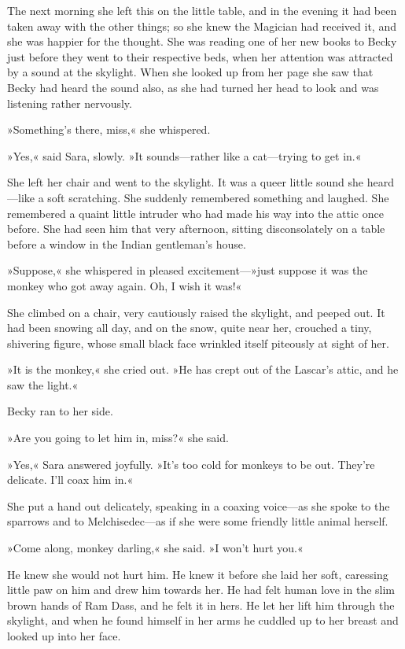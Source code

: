 The next morning she left this on the little table, and in the evening it had been taken away with the other things; so she knew the Magician had received it, and she was happier for the thought. She was reading one of her new books to Becky just before they went to their respective beds, when her attention was attracted by a sound at the skylight. When she looked up from her page she saw that Becky had heard the sound also, as she had turned her head to look and was listening rather nervously.

»Something's there, miss,« she whispered.

»Yes,« said Sara, slowly. »It sounds—rather like a cat—trying to get in.«

She left her chair and went to the skylight. It was a queer little sound she heard—like a soft scratching. She suddenly remembered something and laughed. She remembered a quaint little intruder who had made his way into the attic once before. She had seen him that very afternoon, sitting disconsolately on a table before a window in the Indian gentleman's house.

»Suppose,« she whispered in pleased excitement—»just suppose it was the monkey who got away again. Oh, I wish it was!«

She climbed on a chair, very cautiously raised the skylight, and peeped out. It had been snowing all day, and on the snow, quite near her, crouched a tiny, shivering figure, whose small black face wrinkled itself piteously at sight of her.

»It is the monkey,« she cried out. »He has crept out of the Lascar's attic, and he saw the light.«

Becky ran to her side.

»Are you going to let him in, miss?« she said.

»Yes,« Sara answered joyfully. »It's too cold for monkeys to be out. They're delicate. I'll coax him in.«

She put a hand out delicately, speaking in a coaxing voice—as she spoke to the sparrows and to Melchisedec—as if she were some friendly little animal herself.

»Come along, monkey darling,« she said. »I won't hurt you.«

He knew she would not hurt him. He knew it before she laid her soft, caressing little paw on him and drew him towards her. He had felt human love in the slim brown hands of Ram Dass, and he felt it in hers. He let her lift him through the skylight, and when he found himself in her arms he cuddled up to her breast and looked up into her face.

